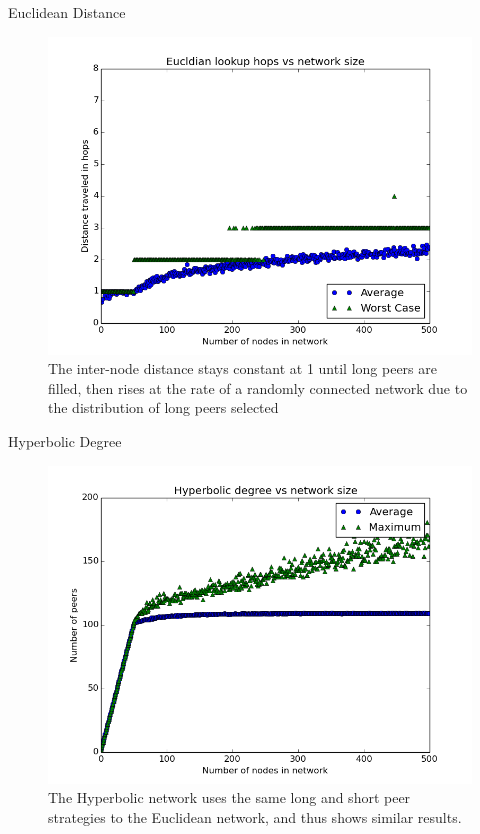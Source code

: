 \documentclass[11pt]{beamer}
\begin{document}
\begin{frame}{Euclidean Distance}
	\begin{figure}
		\centering
		\includegraphics[width=0.7\linewidth]{figs/EucldianDistance}
		\caption[Hops in Euclidean UrDHT]{The inter-node distance stays constant at 1 until long peers are filled, then rises at the rate of a randomly connected network due to the distribution of long peers selected}
		\label{fig:EucldianDistance}
	\end{figure}
\end{frame}
	

\begin{frame}{Hyperbolic Degree}
	
	\begin{figure}
		\centering
		\includegraphics[width=0.7\linewidth]{figs/HyperbolicDegree}
		\caption[Growth of UrDHT degree in a hyperbolic space]{The Hyperbolic network uses the same long and short peer strategies to the Euclidean network, and thus shows similar results.}
		\label{fig:HyperbolicDegree}
	\end{figure}
\end{frame}
	
\end{document}
